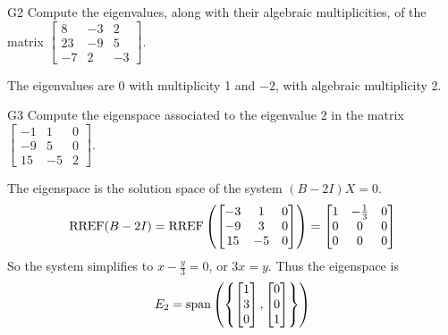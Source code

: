 \documentclass{sbgLAquiz}
\begin{document}
\begin{problem}{G2} 
Compute the eigenvalues, along with their algebraic multiplicities, of the matrix $ \begin{bmatrix} 8 & -3 & 2 \\ 23 & -9 & 5 \\ -7 & 2 & -3 \end{bmatrix}$.
\end{problem}
\begin{solution}
The eigenvalues are $0$ with multiplicity 1 and $-2$, with algebraic multiplicity 2.
\end{solution}

\begin{extract}\newpage\end{extract}
\begin{problem}{G3}
Compute the eigenspace associated to the eigenvalue $2$ in the matrix $\begin{bmatrix} -1 & 1 & 0 \\ -9 & 5 & 0 \\ 15 & -5 & 2 \end{bmatrix}$.
\end{problem}

\begin{solution}
The eigenspace is the solution space of the system $(B-2I)X=0$.
$$\operatorname{RREF}(B-2I)=\operatorname{RREF}\left(\begin{bmatrix} -3 & 1 & 0 \\ -9 & 3 & 0 \\ 15 & - 5 & 0 \end{bmatrix} \right) = \begin{bmatrix} 1 & -\frac{1}{3} & 0 \\ 0 & 0 & 0 \\ 0 & 0 & 0 \end{bmatrix}$$
So the system simplifies to $x-\frac{y}{3}=0$, or $3x=y$.  Thus the eigenspace is $$E_2 = {\rm span}\left( \left\{ \begin{bmatrix} 1 \\ 3 \\ 0 \end{bmatrix}, \begin{bmatrix} 0 \\ 0 \\ 1\end{bmatrix} \right\} \right)$$
\end{solution}
\end{document}
